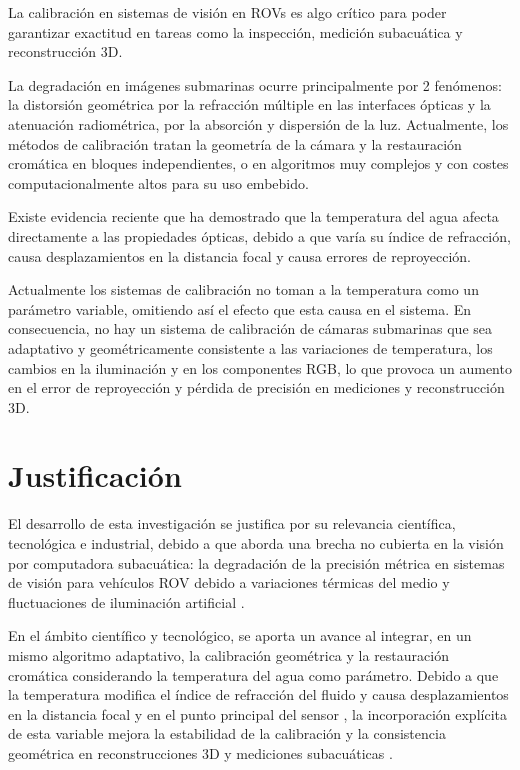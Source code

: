 \documentclass[12pt,letterpaper,spanish,twoside,openright]{report}
\begin{document}
La calibración en sistemas de visión en ROVs es algo crítico para poder garantizar exactitud en tareas como la inspección, medición subacuática y reconstrucción 3D.

La degradación en imágenes submarinas ocurre principalmente por 2 fenómenos: la distorsión geométrica por la refracción múltiple en las interfaces ópticas y la atenuación radiométrica, por la absorción y dispersión de la luz. Actualmente, los métodos de calibración tratan la geometría de la cámara y la restauración cromática en bloques independientes, o en algoritmos muy complejos y con costes computacionalmente altos para su uso embebido.

Existe evidencia reciente que ha demostrado que la temperatura del agua afecta directamente a las propiedades ópticas, debido a que varía su índice de refracción, causa desplazamientos en la distancia focal y causa errores de reproyección.

Actualmente los sistemas de calibración no toman a la temperatura como un parámetro variable, omitiendo así el efecto que esta causa en el sistema. En consecuencia, no hay un sistema de calibración de cámaras submarinas que sea adaptativo y geométricamente consistente a las variaciones de temperatura, los cambios en la iluminación y en los componentes RGB, lo que provoca un aumento en el error de reproyección y pérdida de precisión en mediciones y reconstrucción 3D.


\section{Justificación}

El desarrollo de esta investigación se justifica por su relevancia científica, tecnológica e industrial, debido a que aborda una brecha no cubierta en la visión por computadora subacuática: la degradación de la precisión métrica en sistemas de visión para vehículos ROV debido a variaciones térmicas del medio y fluctuaciones de iluminación artificial \parencite{11176009, 10772075}.

En el ámbito científico y tecnológico, se aporta un avance al integrar, en un mismo algoritmo adaptativo, la calibración geométrica y la restauración cromática considerando la temperatura del agua como parámetro. Debido a que la temperatura modifica el índice de refracción del fluido y causa desplazamientos en la distancia focal y en el punto principal del sensor \parencite{11176009}, la incorporación explícita de esta variable mejora la estabilidad de la calibración y la consistencia geométrica en reconstrucciones 3D y mediciones subacuáticas \parencite{10772075}.
\end{document}
